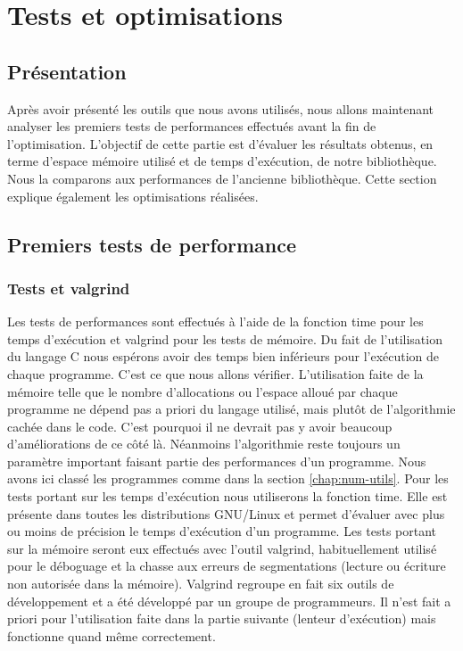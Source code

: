 
\chapter{Tests et optimisations}
\label{chap:tests et optimisations}

\section{Pr\'esentation}

Apr\`es avoir pr\'esent\'e les outils que nous avons utilis\'es, nous allons maintenant analyser les premiers tests de performances effectu\'es 
avant la fin de l'optimisation.
L'objectif de cette partie est d'\'evaluer les r\'esultats obtenus, en terme d'espace m\'emoire utilis\'e et de temps d'ex\'ecution, de notre biblioth\`eque.
Nous la comparons aux performances de l'ancienne biblioth\`eque. Cette section explique \'egalement les optimisations r\'ealis\'ees.

\section{Premiers tests de performance}

\subsection{Tests et valgrind}
Les tests de performances sont effectu\'es \`a l'aide de la fonction time pour les temps d'ex\'ecution et valgrind \citep{valgrind} pour les tests de m\'emoire.
Du fait de l'utilisation du langage C nous esp\'erons avoir des temps bien inf\'erieurs pour l'ex\'ecution de chaque programme. C'est ce que nous allons
 v\'erifier.
L'utilisation faite de la m\'emoire telle que le nombre d'allocations ou l'espace allou\'e par chaque programme ne d\'epend pas a priori du langage
 utilis\'e, mais plut\^ot de l'algorithmie cach\'ee dans le code. C'est pourquoi il ne devrait pas y avoir beaucoup d'am\'eliorations de ce c\^ot\'e l\`a.
N\'eanmoins l'algorithmie reste toujours un param\`etre important faisant partie des performances d'un programme.
Nous avons ici class\'e les programmes comme dans la section \ref{chap:num-utils}.
Pour les tests portant sur les temps d'ex\'ecution nous utiliserons la fonction time. Elle est pr\'esente dans toutes les distributions GNU/Linux et permet d'\'evaluer avec plus ou moins de pr\'ecision le temps d'ex\'ecution d'un programme.
Les tests portant sur la m\'emoire seront eux effectu\'es avec l'outil valgrind, habituellement utilis\'e pour le d\'eboguage et la chasse aux erreurs de segmentations (lecture ou \'ecriture non autoris\'ee dans la m\'emoire).
Valgrind regroupe en fait six outils de d\'eveloppement et a \'et\'e d\'evelopp\'e par un groupe de programmeurs. Il n'est fait a priori pour l'utilisation faite dans la partie suivante (lenteur d'ex\'ecution) mais fonctionne quand m\^eme correctement.
 

